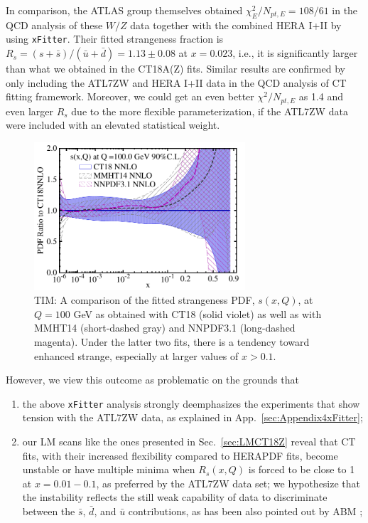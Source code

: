 In comparison, the ATLAS group themselves obtained 
$\chi^2_E/N_{\mathit{pt,E}}=108/61$ in the QCD
analysis \cite{Aaboud:2016btc} of these $W/Z$ data together with the
combined HERA I+II  \cite{Abramowicz:2015mha} by
using \texttt{xFitter}. Their fitted strangeness fraction is
$R_s=(s+\bar{s})/(\bar{u}+\bar{d})=1.13\pm0.08$ at $x=0.023$, i.e., it
is significantly larger than what we obtained in the CT18A(Z) fits. 
Similar results are confirmed by only including the ATL7ZW and HERA I+II
data in the QCD analysis of CT fitting framework. Moreover, we could get an
even better $\chi^2/N_{pt,E}$ as 1.4 and even larger $R_s$ due to the
more flexible parameterization, if the ATL7ZW data were included with an elevated statistical weight. 


\begin{figure}[t]
\includegraphics[width=0.7\textwidth]{fig/ATL7WZ/pdfs_CT18NNLO_MMHT2014nnlo_NNPDF31nnloas01181000_100-0GeV_A90CL_03_sqk_pdfr_cus-lin-2.pdf}
\caption{
		{\color{red}TIM: A comparison of the fitted strangeness PDF, $s(x,Q)$, at $Q\!=\!100$ GeV
		as obtained with CT18 (solid violet) as well as with MMHT14 (short-dashed gray)
		and NNPDF3.1 (long-dashed magenta). Under the latter two fits, there
		is a tendency toward enhanced strange, especially at larger values of
		$x\! >\! 0.1$.
	}}
\label{fig:s_CT-MMHT-NNPDF}
\end{figure}


%
However, we view this outcome as problematic on the grounds that
\begin{enumerate}
\item the above \texttt{xFitter} analysis strongly deemphasizes the
experiments that show tension with the ATL7ZW data, as explained in
App.~\ref{sec:Appendix4xFitter};
\item our LM scans like the ones presented in Sec.~\ref{sec:LMCT18Z}
reveal that CT fits, with their increased
flexibility compared to HERAPDF fits, become unstable or have multiple
minima when $R_s(x,Q)$ is forced to be close to 1 at $x=0.01-0.1$, as
preferred by the ATL7ZW data set; we hypothesize that the instability reflects the still weak capability of data to discriminate between the $\bar s$, $\bar d$, and $\bar u$ contributions, as has been also pointed out by ABM \cite{Alekhin:2017olj}; 
\end{enumerate}
%

